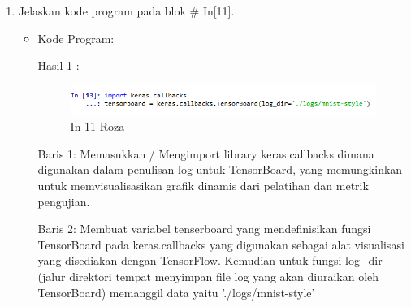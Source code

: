 \begin{enumerate}
\item Jelaskan kode program pada blok \# In[11].
\begin{itemize}
\item Kode Program:

\par Hasil \ref{in11roza} :
\begin{figure}[!hbtp]
\centering
\includegraphics[scale=0.7]{figures/prak11roza.png}
\caption{In 11 Roza}
\label{in11roza}
\end{figure}
\par Baris 1: Memasukkan / Mengimport library keras.callbacks dimana digunakan dalam penulisan log untuk TensorBoard, yang memungkinkan untuk memvisualisasikan grafik dinamis dari pelatihan dan metrik pengujian.
\par Baris 2: Membuat variabel tenserboard yang mendefinisikan fungsi TensorBoard pada keras.callbacks yang digunakan sebagai alat visualisasi yang disediakan dengan TensorFlow. Kemudian untuk fungsi log\_dir (jalur direktori tempat menyimpan file log yang akan diuraikan oleh TensorBoard) memanggil data yaitu './logs/mnist-style'
\end{itemize}
\par


\end{enumerate}
